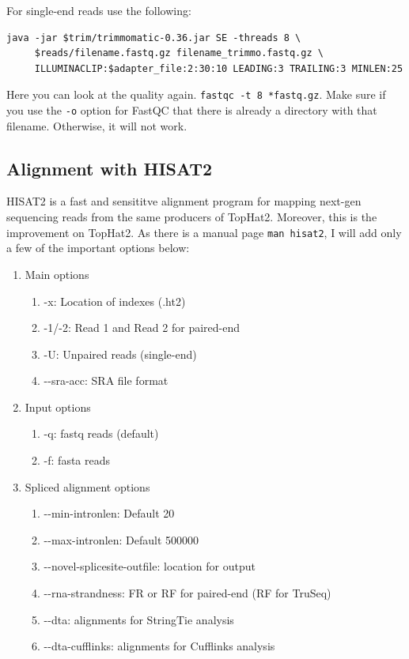 For single-end reads use the following:

\begin{verbatim}
java -jar $trim/trimmomatic-0.36.jar SE -threads 8 \
     $reads/filename.fastq.gz filename_trimmo.fastq.gz \
     ILLUMINACLIP:$adapter_file:2:30:10 LEADING:3 TRAILING:3 MINLEN:25
\end{verbatim}

Here you can look at the quality again. \texttt{fastqc -t 8 *fastq.gz}. Make sure if you use the \texttt{-o} option for FastQC that there is already a directory with that filename. Otherwise, it will not work.

\subsection{Alignment with HISAT2}
HISAT2\cite{Kim2015} is a fast and sensititve alignment program for mapping next-gen sequencing reads from the same producers of TopHat2. Moreover, this is the improvement on TopHat2. As there is a manual page \texttt{man hisat2}, I will add only a few of the important options below:

\begin{enumerate}
\item Main options
  \begin{enumerate}
  \item -x: Location of indexes (.ht2)
  \item -1/-2: Read 1 and Read 2 for paired-end
  \item -U: Unpaired reads (single-end)
  \item -{}-sra-acc: SRA file format
  \end{enumerate}
\item Input options
  \begin{enumerate}
  \item -q: fastq reads (default)
  \item -f: fasta reads
  \end{enumerate}
\item Spliced alignment options
  \begin{enumerate}
  \item -{}-min-intronlen: Default 20
  \item -{}-max-intronlen: Default 500000
  \item -{}-novel-splicesite-outfile: location for output
  \item -{}-rna-strandness: FR or RF for paired-end (RF for TruSeq)
  \item -{}-dta: alignments for StringTie analysis
  \item -{}-dta-cufflinks: alignments for Cufflinks analysis
  \end{enumerate}
\end{enumerate}

